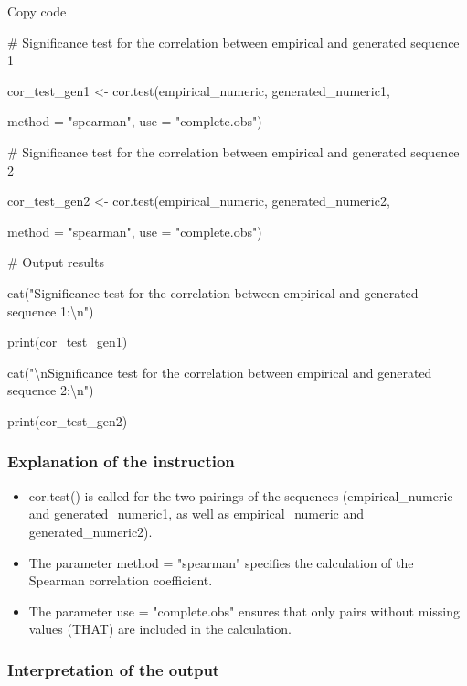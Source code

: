\documentclass[
]{article}
\begin{document}
Copy code

\# Significance test for the correlation between empirical and generated
sequence 1

cor\_test\_gen1 \textless- cor.test(empirical\_numeric,
generated\_numeric1,

method = "spearman", use = "complete.obs")

\# Significance test for the correlation between empirical and generated
sequence 2

cor\_test\_gen2 \textless- cor.test(empirical\_numeric,
generated\_numeric2,

method = "spearman", use = "complete.obs")

\# Output results

cat("Significance test for the correlation between empirical and
generated sequence 1:\textbackslash n")

print(cor\_test\_gen1)

cat("\textbackslash nSignificance test for the correlation between
empirical and generated sequence 2:\textbackslash n")

print(cor\_test\_gen2)

\subsubsection{\texorpdfstring{\textbf{Explanation of the
instruction}}{Explanation of the instruction}}\label{explanation-of-the-instruction}

\begin{itemize}
\item
  cor.test() is called for the two pairings of the sequences
  (empirical\_numeric and generated\_numeric1, as well as
  empirical\_numeric and generated\_numeric2).
\item
  The parameter method = "spearman" specifies the calculation of the
  Spearman correlation coefficient.
\item
  The parameter use = "complete.obs" ensures that only pairs without
  missing values \hspace{0pt}\hspace{0pt}(THAT) are included in the
  calculation.
\end{itemize}

\subsubsection{\texorpdfstring{\textbf{Interpretation of the
output}}{Interpretation of the output}}\label{interpretation-of-the-output}
\end{document}
